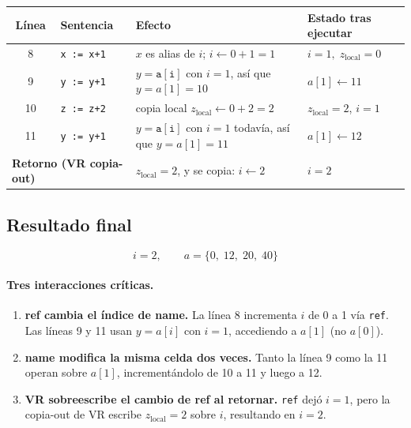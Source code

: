 \documentclass[11pt]{article}
\begin{document}
\begin{center}
\renewcommand{\arraystretch}{1.4}
\begin{tabular}{c l p{} p{}}
  \toprule
  Línea & Sentencia & Efecto & Estado tras ejecutar \\
  \midrule
  8 & \texttt{x := x+1} &
      $x$ es alias de $i$; $i \leftarrow 0{+}1 = 1$ &
      $i=1,\; z_{\text{local}}=0$ \\
  9 & \texttt{y := y+1} &
      $y = \mathtt{a[i]}$ con $i=1$, así que $y = a[1] = 10$ &
      $a[1] \leftarrow 11$ \\
  10 & \texttt{z := z+2} &
      copia local $z_{\text{local}} \leftarrow 0{+}2 = 2$ &
      $z_{\text{local}}=2$, $i=1$ \\
  11 & \texttt{y := y+1} &
      $y = \mathtt{a[i]}$ con $i=1$ todavía, así que $y = a[1] = 11$ &
      $a[1] \leftarrow 12$ \\
  \midrule
  \multicolumn{2}{l}{\textbf{Retorno (VR copia-out)}} &
      $z_{\text{local}} = 2$, y se copia: $i \leftarrow 2$ &
      $i = 2$ \\
  \bottomrule
\end{tabular}
\end{center}

\subsection*{Resultado final}


\[
  i = 2, \qquad a = \{0,\; 12,\; 20,\; 40\}
\]

\paragraph{Tres interacciones críticas.} \begin{enumerate}
    \item \textbf{ref cambia el índice de name.}
          La línea 8 incrementa $i$ de 0 a 1 vía \texttt{ref}.
          Las líneas 9 y 11 usan $y = a[i]$ con $i=1$, accediendo a
          $a[1]$ (no $a[0]$).
    \item \textbf{name modifica la misma celda dos veces.}
          Tanto la línea 9 como la 11 operan sobre $a[1]$,
          incrementándolo de 10 a 11 y luego a 12.
    \item \textbf{VR sobreescribe el cambio de ref al retornar.}
          \texttt{ref} dejó $i=1$, pero la copia-out de VR escribe
          $z_{\text{local}}=2$ sobre $i$, resultando en $i=2$.
  \end{enumerate}
\end{document}
